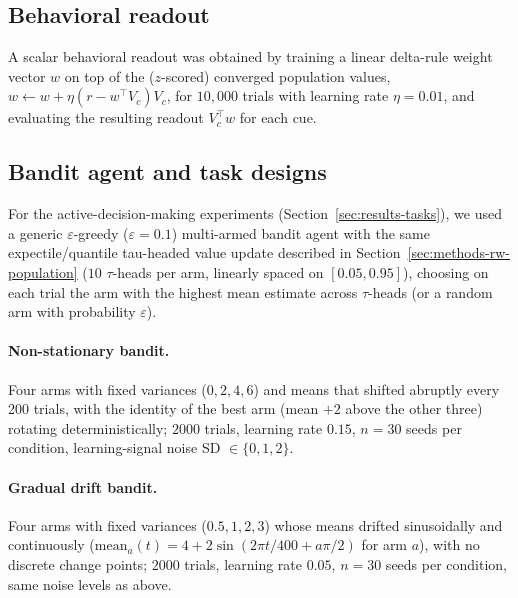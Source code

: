 \documentclass[11pt]{article}
\begin{document}
\subsection{Behavioral readout}
\label{sec:methods-readout}

A scalar behavioral readout was obtained by training a linear delta-rule weight vector $w$ on top of the ($z$-scored) converged population values, $w \leftarrow w + \eta (r - w^\top V_c) V_c$, for $10{,}000$ trials with learning rate $\eta=0.01$, and evaluating the resulting readout $V_c^\top w$ for each cue.

\subsection{Bandit agent and task designs}
\label{sec:methods-tasks}

For the active-decision-making experiments (Section~\ref{sec:results-tasks}), we used a generic $\varepsilon$-greedy ($\varepsilon=0.1$) multi-armed bandit agent with the same expectile/quantile tau-headed value update described in Section~\ref{sec:methods-rw-population} ($10$ $\tau$-heads per arm, linearly spaced on $[0.05, 0.95]$), choosing on each trial the arm with the highest mean estimate across $\tau$-heads (or a random arm with probability $\varepsilon$).

\paragraph{Non-stationary bandit.} Four arms with fixed variances ($0, 2, 4, 6$) and means that shifted abruptly every 200 trials, with the identity of the best arm (mean $+2$ above the other three) rotating deterministically; $2000$ trials, learning rate $0.15$, $n=30$ seeds per condition, learning-signal noise SD $\in \{0, 1, 2\}$.

\paragraph{Gradual drift bandit.} Four arms with fixed variances ($0.5, 1, 2, 3$) whose means drifted sinusoidally and continuously ($\mathrm{mean}_a(t) = 4 + 2\sin(2\pi t / 400 + a\pi/2)$ for arm $a$), with no discrete change points; $2000$ trials, learning rate $0.05$, $n=30$ seeds per condition, same noise levels as above.
\end{document}
